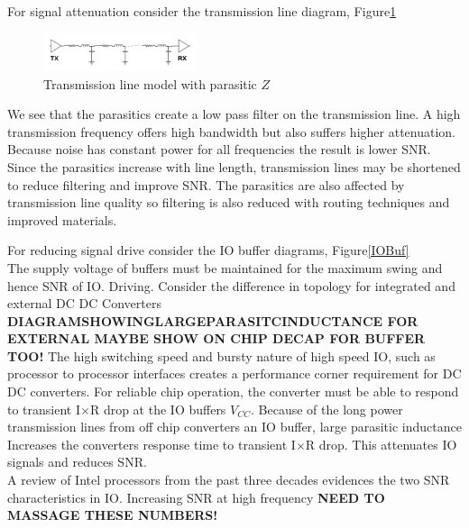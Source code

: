\documentclass[letterpaper,twocolumn,10pt]{article}
\begin{document}
For signal attenuation consider the transmission line diagram, Figure\ref{TXLine}\\
\begin{figure}[here]
\includegraphics[width=0.4\textwidth]{TransmissionLine}
\caption{Transmission line model with parasitic $Z$}
\label{TXLine}
\end{figure}
We see that the parasitics create a low pass filter on the transmission line. A high transmission frequency offers high bandwidth but also suffers higher attenuation. Because noise has constant power for all frequencies the result is lower SNR. Since the parasitics increase with line length, transmission lines may be shortened to reduce filtering and improve SNR. The parasitics are also affected by transmission line quality so filtering is also reduced with routing techniques and improved materials.

For reducing signal drive consider the IO buffer diagrams, Figure\ref{IOBuf}\\ %
The supply voltage of buffers must be maintained for the maximum swing and hence SNR of IO. Driving. Consider the difference in topology for integrated and external DC DC Converters\\
\textbf{DIAGRAMSHOWINGLARGEPARASITCINDUCTANCE FOR EXTERNAL MAYBE SHOW ON CHIP DECAP FOR BUFFER TOO!}
The high switching speed and bursty nature of high speed IO, such as processor to processor interfaces creates a performance corner requirement for DC DC converters. For reliable chip operation, the converter must be able to respond to transient I$\times$R drop at the IO buffers $V_{CC}$. Because of the long power transmission lines from off chip converters an IO buffer, large parasitic inductance Increases the converters response time to transient I$\times$R drop. This attenuates IO signals and reduces SNR.\\

A review of Intel processors from the past three decades evidences the two SNR characteristics in IO. Increasing SNR at high frequency \textbf{NEED TO MASSAGE THESE NUMBERS!} 
\end{document}
